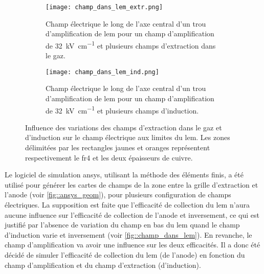       \begin{figure}[!htb]
        \begin{subfigure}[t]{0.48\textwidth}
          \texttt{[image: champ\_dans\_lem\_extr.png]}
          \caption{\label{fig::champ_dans_lem_extr}Champ électrique le long de l'axe central d'un trou d'amplification de \gls{lem} pour un champ d'amplification de \SI{32}{\kilo\volt\per\centi\meter} et plusieurs champs d'extraction dans le gaz.}
        \end{subfigure}
        \hfill
        \begin{subfigure}[t]{0.48\textwidth}
          \texttt{[image: champ\_dans\_lem\_ind.png]}
          \caption{\label{fig::champ_dans_lem_ind}Champ électrique le long de l'axe central d'un trou d'amplification de \gls{lem} pour un champ d'amplification de \SI{32}{\kilo\volt\per\centi\meter} et plusieurs champs d'induction.}
        \end{subfigure}
        \caption[Influence des variations des champs d'extraction et d'induction sur le champ électrique aux limites du LEM]{\label{fig::champ_dans_lem}Influence des variations des champs d'extraction dans le gaz et d'induction sur le champ électrique aux limites du \gls{lem}. Les zones délimitées par les rectangles jaunes et oranges représentent respectivement le \gls{fr4} et les deux épaisseurs de cuivre.}
      \end{figure}
      
      Le logiciel de simulation \gls{ansys}, utilisant la méthode des éléments finis, a été utilisé pour générer les cartes de champs de la zone entre la grille d'extraction et l'anode (voir \autoref{fig::ansys_geom}), pour plusieurs configuration de champs électriques. La supposition est faite que l'efficacité de collection du \gls{lem} n'aura aucune influence sur l'efficacité de collection de l'anode et inversement, ce qui est justifié par l'absence de variation du champ en bas du \gls{lem} quand le champ d'induction varie et inversement (voir \autoref{fig::champ_dans_lem}). En revanche, le champ d'amplification va avoir une influence sur les deux efficacités. Il a donc été décidé de simuler l'efficacité de collection du \gls{lem} (de l'anode) en fonction du champ d'amplification et du champ d'extraction (d'induction).
            

